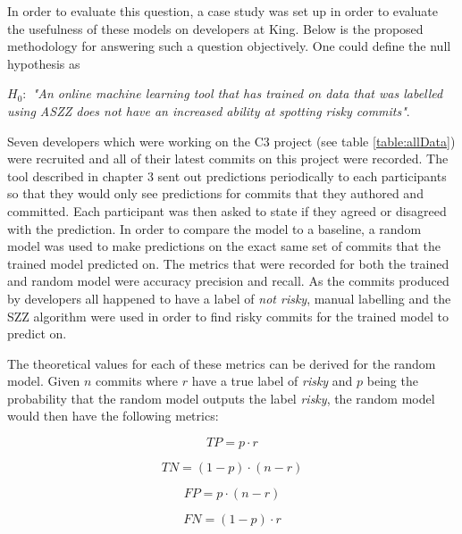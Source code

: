 \documentclass[../main.tex]{subfiles}
\begin{document}
In order to evaluate this question, a case study was set up in order to evaluate the usefulness of these models on developers at King. Below is the proposed methodology for answering such a question objectively. One could define the null hypothesis as
\begin{center}
    \textit{$H_0:$ "An online machine learning tool that has trained on data that was labelled using ASZZ does not have an increased ability at spotting risky commits"}.
\end{center}

Seven developers which were working on the C3 project (see table \ref{table:allData}) were recruited and all of their latest commits on this project were recorded. The tool described in chapter 3 sent out predictions periodically to each participants so that they would only see predictions for commits that they authored and committed. Each participant was then asked to state if they agreed or disagreed with the prediction. In order to compare the model to a baseline, a random model was used to make predictions on the exact same set of commits that the trained model predicted on. The metrics that were recorded for both the trained and random model were accuracy precision and recall. As the commits produced by developers all happened to have a label of \textit{not risky}, manual labelling and the SZZ algorithm were used in order to find risky commits for the trained model to predict on. 

The theoretical values for each of these metrics can be derived for the random model. Given $n$ commits where $r$ have a true label of \textit{risky} and $p$ being the probability that the random model outputs the label \textit{risky}, the random model would then have the following metrics:

\begin{equation}
     TP = p \cdot r
\end{equation}

\begin{equation}
     TN = (1-p) \cdot (n-r)
\end{equation}

\begin{equation}
     FP = p \cdot (n-r)
\end{equation}

\begin{equation}
     FN = (1-p) \cdot r
\end{equation}

\vspace{10pt}
\end{document}
